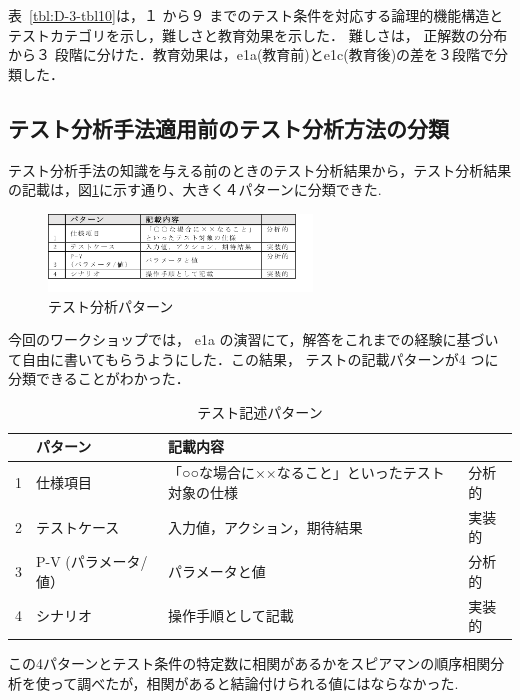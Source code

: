 表~\ref{tbl:D-3-tbl10}は，１ から９ までのテスト条件を対応する論理的機能構造とテストカテゴリを示し，難しさと教育効果を示した． 難しさは， 正解数の分布から３ 段階に分けた．教育効果は，e1a(教育前)とe1c(教育後)の差を３段階で分類した．


\subsection{テスト分析手法適用前のテスト分析方法の分類}
テスト分析手法の知識を与える前のときのテスト分析結果から，テスト分析結果の記載は，図\ref{fig:D-3-Fig14}に示す通り、大きく４パターンに分類できた.
\begin{figure}[h]
  \begin{center}
  \includegraphics[width=7cm]{./image/D-3-Fig14.png}
  \caption{テスト分析パターン}
  \label{fig:D-3-Fig14}
  \end{center}
\end{figure}

今回のワークショップでは， e1a の演習にて，解答をこれまでの経験に基づいて自由に書いてもらうようにした．この結果， テストの記載パターンが4 つに分類できることがわかった．
\begin{table}[htbp]
  \centering
  \caption{テスト記述パターン}
    \begin{tabular}{|c|p{8.57em}|p{10.215em}|p{3.855em}|}
    \hline
          & \textbf{パターン} & \textbf{記載内容} & \multicolumn{1}{c|}{} \bigstrut\\
    \hline
    1     & 仕様項目  & 「○○な場合に××なること」といったテスト対象の仕様 & 分析的 \bigstrut\\
    \hline
    2     & テストケース & 入力値，アクション，期待結果 & 実装的 \bigstrut\\
    \hline
    3     & P-V
(パラメータ/値） & パラメータと値 & 分析的 \bigstrut[t]\\
    4     & シナリオ  & 操作手順として記載 & 実装的 \bigstrut[b]\\
    \hline
    \end{tabular}%
  \label{tbl:D-3-tbl11}%
\end{table}%

この4パターンとテスト条件の特定数に相関があるかをスピアマンの順序相関分析を使って調べたが，相関があると結論付けられる値にはならなかった.




